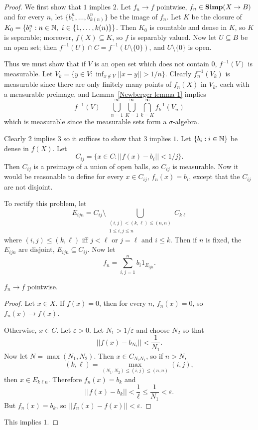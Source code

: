 \begin{proof}
We first show that $1$ implies $2$.
Let $f_{n} \to f$ pointwise, $f_{n} \in \mathbf{Simp}(X \to B)$ and for every $n$, let $\{b_1^n, \dots, b_{k(n)}^n\}$ be the image of $f_{n}$.
Let $K$ be the closure of $K_0 = \{b_i^n: n \in \mathbb{N},~i \in \{1, \dots, k(n)\}\}$.
Then $K_0$ is countable and dense in $K$, so $K$ is separable; moreover, $f(X) \subseteq K$, so $f$ is separably valued.
Now let $U \subseteq B$ be an open set; then $f^{-1}(U) \cap C = f^{-1}(U \setminus \{0\})$, and $U \setminus \{0\}$ is open.

Thus we must show that if $V$ is an open set which does not contain $0$, $f^{-1}(V)$ is measurable. Let $V_{k} = \{y \in V: \inf_{x \notin V} ||x - y|| > 1/n\}$. Clearly $f_{n}^{-1}(V_{k})$ is measurable since there are only finitely many points of $f_{n}(X)$ in $V_{k}$, each with a measurable preimage, and Lemma~\ref{Newberger lemma 1} implies
\[f^{-1}(V) = \bigcup_{n=1}^{\infty} \bigcup_{K=1}^{\infty} \bigcap_{k=K}^{\infty} f_{k}^{-1}(V_{n})\]
which is measurable since the measurable sets form a $\sigma$-algebra.

Clearly $2$ implies $3$ so it suffices to show that $3$ implies $1$.
Let $\{b_i: i \in \mathbb{N}\}$ be dense in $f(X)$.
Let
\[C_{ij} = \{x \in C: ||f(x) - b_i|| < 1/j\}.\]
Then $C_{ij}$ is a preimage of a union of open balls, so $C_{ij}$ is measurable.
Now it would be reasonable to define for every $x \in C_{ij}$, $f_{n}(x) = b_i$, except that the $C_{ij}$ are not disjoint.

To rectify this problem, let
\[E_{ijn} = C_{ij} \setminus \bigcup_{\substack{(i,j) < (k, \ell) \leq (n, n)\\1 \leq i,j \leq n}} C_{k\ell}\]
where $(i, j) \leq (k, \ell)$ iff $j < \ell$ or $j = \ell$ and $i \leq k$.
Then if $n$ is fixed, the $E_{ijn}$ are disjoint, $E_{ijn} \subseteq C_{ij}$.
Now let
\[f_{n} = \sum_{i,j=1}^{n} b_{i} 1_{E_{ijn}}.\]
\begin{sublemma}
$f_{n} \to f$ pointwise.
\end{sublemma}
\begin{proof}
Let $x \in X$. If $f(x) = 0$, then for every $n$, $f_{n}(x) = 0$, so $f_{n}(x) \to f(x)$.

Otherwise, $x \in C$. Let $\varepsilon > 0$. Let $N_1 > 1/\varepsilon$ and choose $N_2$ so that
\[||f(x) - b_{N_2}|| < \frac{1}{N_1}.\]
Now let $N = \max(N_1, N_2)$. Then $x \in C_{N_2N_1}$, so if $n > N$,
\[(k, \ell) = \max_{(N_1, N_2) \leq (i, j) \leq (n, n)} (i,j),\]
then $x \in E_{k\ell n}$. Therefore $f_{n}(x) = b_{k}$ and
\[||f(x) - b_{k}|| < \frac{1}{\ell} \leq \frac{1}{N_1} < \varepsilon.\]
But $f_{n}(x) = b_{k}$, so $||f_{n}(x) - f(x)|| < \varepsilon$.
\end{proof}
This implies $1$.
\end{proof}

